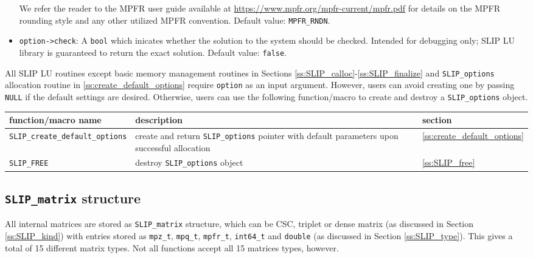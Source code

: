 \documentclass[12pt]{article}
\theoremstyle{definition}
\begin{document}
\begin{itemize}
\noindent We refer the reader to the MPFR user guide available at
\url{https://www.mpfr.org/mpfr-current/mpfr.pdf} for details on the MPFR
rounding style and any other utilized MPFR convention. Default value:
\verb|MPFR_RNDN|.

\item
\verb|option->check|: A \verb|bool| which inicates whether the solution to the
system should be checked. Intended for debugging only; SLIP LU library is
guaranteed to return the exact solution. Default value: \verb|false|.

\end{itemize}

All SLIP LU routines except basic memory management routines in Sections
\ref{ss:SLIP_calloc}-\ref{ss:SLIP_finalize} and \verb|SLIP_options| allocation
routine in \ref{ss:create_default_options} require \verb|option| as an input
argument. However, users can avoid creating one by passing \verb|NULL| if the
default settings are desired.  Otherwise, users can use the following
function/macro to create and destroy a \verb|SLIP_options| object.

\begin{center}
\begin{tabular}{lp{2.5in}l}
\hline
function/macro name & description & section \\
\hline
\verb|SLIP_create_default_options|
    & create and return \verb|SLIP_options| pointer
      with default parameters upon successful allocation
    & \ref{ss:create_default_options} \\
\hline
\verb|SLIP_FREE|
    & destroy \verb|SLIP_options| object
    & \ref{ss:SLIP_free} \\
\hline
\end{tabular}
\end{center}

\cprotect\subsection{\verb|SLIP_matrix| structure}
\label{ss:SLIP_matrix}

All internal matrices are stored as \verb|SLIP_matrix| structure, which can
be CSC, triplet or dense matrix (as discussed in Section \ref{ss:SLIP_kind})
with entries stored as \verb|mpz_t|, \verb|mpq_t|, \verb|mpfr_t|,
\verb|int64_t| and \verb|double| (as discussed in Section \ref{ss:SLIP_type}).
This gives a total of 15 different matrix types.  Not all functions accept
all 15 matrices types, however.
\end{document}
